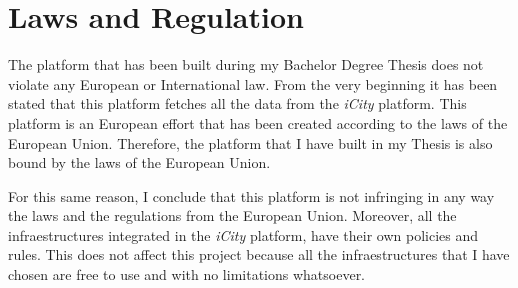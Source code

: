  
\section{Laws and Regulation}

The platform that has been built during my Bachelor Degree Thesis does not
violate any European or International law. From the very beginning it has been
stated that this platform fetches all the data from the {\it iCity} platform.
This platform is an European effort that has been created according to the laws
of the European Union. Therefore, the platform that I have built in my Thesis
is also bound by the laws of the European Union.

For this same reason, I conclude that this platform is not infringing in any
way the laws and the regulations from the European Union. Moreover, all the
infraestructures integrated in the {\it iCity} platform, have their own
policies and rules. This does not affect this project because all the
infraestructures that I have chosen are free to use and with no limitations
whatsoever.
